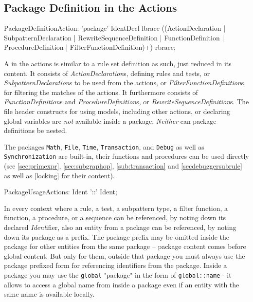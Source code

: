 \subsection{Package Definition in the Actions}\label{sub:packageaction} 

\begin{rail}
  PackageDefinitionAction: 'package' IdentDecl lbrace ((ActionDeclaration | SubpatternDeclaration | RewriteSequenceDefinition | FunctionDefinition | ProcedureDefinition | FilterFunctionDefinition)+) rbrace;
\end{rail}

A  in the actions is similar to a rule set definition as such, just reduced in its content.
It consists of \emph{ActionDeclaration}s, defining rules and tests, or \emph{SubpatternDeclaration}s to be used from the actions, or \emph{FilterFunctionDefinition}s, for filtering the matches of the actions.
It furthermore consists of \emph{FunctionDefinition}s and \emph{ProcedureDefinition}s, or \emph{RewriteSequenceDefinition}s. 
The file header constructs for using models, including other actions, or declaring global variables are \emph{not} available inside a package.
\emph{Neither} can package definitions be nested.

The packages \texttt{Math}, \texttt{File}, \texttt{Time}, \texttt{Transaction}, and \texttt{Debug} as well as \texttt{Synchronization} are built-in, their functions and procedures can be used directly (see \ref{sec:primexpr}, \ref{sec:subgraphop}, \ref{sub:transaction} and \ref{secdebuggersubrule} as well as \ref{locking} for their content).

\begin{rail}
  PackageUsageActions: Ident '::' Ident;
\end{rail}

In every context where a rule, a test, a subpattern type, a filter function, a function, a procedure, or a sequence can be referenced, by noting down its declared \emph{Ident}ifier, 
also an entity from a package can be referenced,
by noting down its package as a prefix.
The package prefix may be omitted inside the package for other entities from the same package -- package content comes before global content.
But only for them, outside that package you must always use the package prefixed form for referencing identifiers from the package.
Inside a package you may use the \texttt{global} "package" in the form of \texttt{global::name} - it allows to access a global name from inside a package even if an entity with the same name is available locally.

